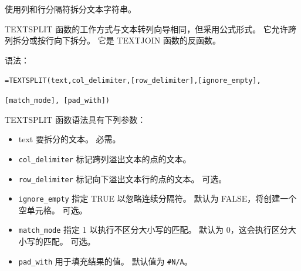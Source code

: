 使用列和行分隔符拆分文本字符串。

TEXTSPLIT 函数的工作方式与文本转列向导相同，但采用公式形式。 它允许跨列拆分或按行向下拆分。 它是 TEXTJOIN 函数的反函数。 

语法：

\verb|=TEXTSPLIT(text,col_delimiter,[row_delimiter],[ignore_empty], |

\verb|[match_mode], [pad_with])|

TEXTSPLIT 函数语法具有下列参数：
\begin{itemize}
  \item text       要拆分的文本。 必需。
  \item \verb|col_delimiter|       标记跨列溢出文本的点的文本。
  \item \verb|row_delimiter|       标记向下溢出文本行的点的文本。 可选。
  \item \verb|ignore_empty|       指定 TRUE 以忽略连续分隔符。 默认为 FALSE，将创建一个空单元格。 可选。
  \item \verb|match_mode|    指定 1 以执行不区分大小写的匹配。 默认为 0，这会执行区分大小写的匹配。 可选。
  \item \verb|pad_with|           用于填充结果的值。 默认值为 \verb|#N/A|。
\end{itemize}